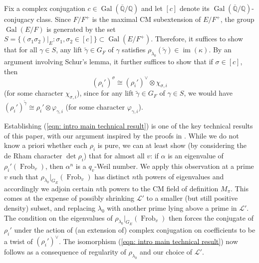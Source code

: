 \documentclass{amsart}
\theoremstyle{definition}
\numberwithin{equation}{section} %
\newcommand{\im}{\operatorname{im}}
\newcommand{\Frob}{\operatorname{Frob}}
\newcommand{\Gal}{\operatorname{Gal}}
\newcommand{\bb}[1]{\mathbb{#1}}
\newcommand{\mc}[1]{\mathcal{#1}}
\newcommand{\wt}[1]{\widetilde{#1}}
\newcommand{\ol}[1]{\overline{#1}}
\begin{document}
Fix a complex conjugation \( c\in\Gal(\ol{\bb{Q}}/\bb{Q}) \) and let \( [c] \) denote its \( \Gal(\ol{\bb{Q}}/\bb{Q}) \)-conjugacy class. Since \( F/F^+ \) is the maximal CM subextension of \( E/F^+ \), the group \( \Gal(E/F) \) is generated by the set \( S = \{ (\sigma_1\sigma_2)|_E:\sigma_1,\sigma_2\in [c] \}\subset \Gal(E/F^+) \). Therefore, it suffices to show that for all \( \gamma\in S \), any lift \( \wt{\gamma}\in G_F \) of \( \gamma \) satisfies \( \rho_{\lambda_0}(\wt{\gamma})\in \im(\kappa) \).  
By an argument involving Schur's lemma, it further suffices to show that if \( \sigma\in[c] \), then 
\begin{equation} \label{eqn: intro main technical result}
(\rho_i')^\sigma\cong (\rho_i')^\vee\otimes \chi_{\sigma,i}    
\end{equation}  
(for some character \( \chi_{\sigma,i} \)), since for any lift \( \wt{\gamma}\in G_F \) of \( \gamma\in S \), we would have \( (\rho_i')^{\wt{\gamma}}\cong \rho_i'\otimes \varphi_{\gamma,i} \) (for some character \( \varphi_{\gamma,i} \)).

Establishing (\ref{eqn: intro main technical result}) is one of the key technical results of this paper, with our argument inspired by the proofs in \cite[\S7]{Xia19}.
While we do not know a priori whether each $\rho_i$ is pure, we can at least show (by considering the de Rham character $\det \rho_i$) that for almost all \( v \): if $\alpha$ is an eigenvalue of $\rho_i'(\Frob_v)$, then $\alpha^n$ is a $q_v$-Weil number. We apply this observation at a prime $v$ such that $\rho_{\lambda_0}|_{G_E}(\Frob_v)$ has distinct $n$th powers of eigenvalues and accordingly we adjoin certain $n$th powers to the CM field of definition $M_\pi$. This comes at the expense of possibly shrinking $\mc{L}'$ to a smaller (but still positive density) subset, and replacing $\lambda_0$ with another prime lying above a prime in $\mc{L}'$. The condition on the eigenvalues of $\rho_{\lambda_0}|_{G_E}(\Frob_v)$ then forces the conjugate of $\rho_i'$ under the action of (an extension of) complex conjugation on coefficients to be a twist of $(\rho_i')^\vee$. The isomorphism (\ref{eqn: intro main technical result}) now follows as a consequence of regularity of $\rho_{\lambda_0}$ and our choice of $\mc{L}'$.
\end{document}
